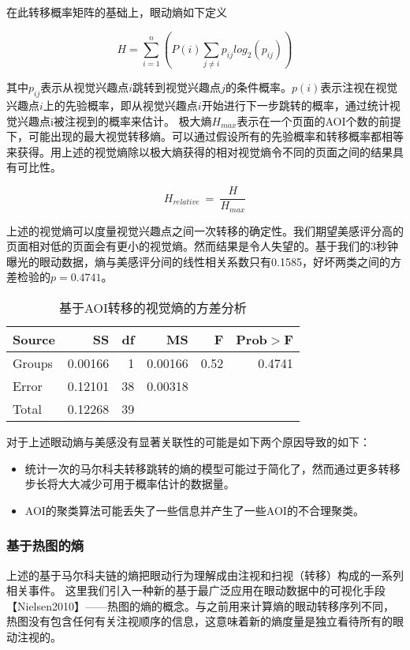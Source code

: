 在此转移概率矩阵的基础上，眼动熵如下定义

$$H = \sum_{i=1}^n(P(i)\sum_{j\neq i} p_{ij}log_2(p_{ij}))$$

其中$p_{ij}$表示从视觉兴趣点$i$跳转到视觉兴趣点$j$的条件概率。$p(i)$表示注视在视觉兴趣点$i$上的先验概率，即从视觉兴趣点$i$开始进行下一步跳转的概率，通过统计视觉兴趣点i被注视到的概率来估计。
极大熵$H_{max}$表示在一个页面的AOI个数的前提下，可能出现的最大视觉转移熵。可以通过假设所有的先验概率和转移概率都相等来获得。用上述的视觉熵除以极大熵获得的相对视觉熵令不同的页面之间的结果具有可比性。

$$H_{relative}~=~\frac{H}{H_{max}}$$

上述的视觉熵可以度量视觉兴趣点之间一次转移的确定性。我们期望美感评分高的页面相对低的页面会有更小的视觉熵。然而结果是令人失望的。基于我们的3秒钟曝光的眼动数据，熵与美感评分间的线性相关系数只有0.1585，好坏两类之间的方差检验的$p=0.4741$。

\begin{table}[H]
\centering
\begin{tabular}{lrrrrr}
  \hline
  Source&SS&df&MS&F&Prob$>$F\\ \hline
  Groups&0.00166&1&0.00166&0.52&0.4741\\
  Error&0.12101&38&0.00318&&\\
  Total&0.12268&39&&&\\
  \hline
\end{tabular}
\caption{基于AOI转移的视觉熵的方差分析}
\label{tab:ANOVA-ve}
\end{table}

对于上述眼动熵与美感没有显著关联性的可能是如下两个原因导致的如下：

\begin{itemize}
  \item 统计一次的马尔科夫转移跳转的熵的模型可能过于简化了，然而通过更多转移步长将大大减少可用于概率估计的数据量。
  \item AOI的聚类算法可能丢失了一些信息并产生了一些AOI的不合理聚类。
\end{itemize}

\subsubsection{基于热图的熵}
上述的基于马尔科夫链的熵把眼动行为理解成由注视和扫视（转移）构成的一系列相关事件。
这里我们引入一种新的基于最广泛应用在眼动数据中的可视化手段【Nielsen2010】——热图的熵的概念。与之前用来计算熵的眼动转移序列不同，热图没有包含任何有关注视顺序的信息，这意味着新的熵度量是独立看待所有的眼动注视的。

